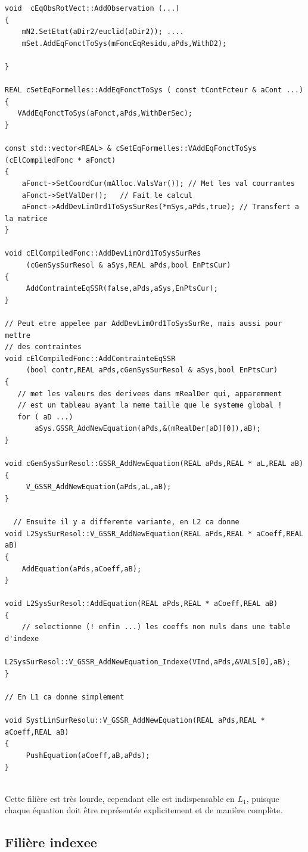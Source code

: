 {\small
\begin{verbatim}
void  cEqObsRotVect::AddObservation (...)
{
    mN2.SetEtat(aDir2/euclid(aDir2)); ....
    mSet.AddEqFonctToSys(mFoncEqResidu,aPds,WithD2);

}

REAL cSetEqFormelles::AddEqFonctToSys ( const tContFcteur & aCont ...)
{
   VAddEqFonctToSys(aFonct,aPds,WithDerSec);
}

const std::vector<REAL> & cSetEqFormelles::VAddEqFonctToSys (cElCompiledFonc * aFonct)
{
    aFonct->SetCoordCur(mAlloc.ValsVar()); // Met les val courrantes
    aFonct->SetValDer();   // Fait le calcul
    aFonct->AddDevLimOrd1ToSysSurRes(*mSys,aPds,true); // Transfert a la matrice
}

void cElCompiledFonc::AddDevLimOrd1ToSysSurRes
     (cGenSysSurResol & aSys,REAL aPds,bool EnPtsCur)
{
     AddContrainteEqSSR(false,aPds,aSys,EnPtsCur);
}

// Peut etre appelee par AddDevLimOrd1ToSysSurRe, mais aussi pour mettre
// des contraintes
void cElCompiledFonc::AddContrainteEqSSR
     (bool contr,REAL aPds,cGenSysSurResol & aSys,bool EnPtsCur)
{
   // met les valeurs des derivees dans mRealDer qui, apparemment
   // est un tableau ayant la meme taille que le systeme global !
   for ( aD ...)
       aSys.GSSR_AddNewEquation(aPds,&(mRealDer[aD][0]),aB);
}

void cGenSysSurResol::GSSR_AddNewEquation(REAL aPds,REAL * aL,REAL aB)
{
     V_GSSR_AddNewEquation(aPds,aL,aB);
}

  // Ensuite il y a differente variante, en L2 ca donne
void L2SysSurResol::V_GSSR_AddNewEquation(REAL aPds,REAL * aCoeff,REAL aB)
{
    AddEquation(aPds,aCoeff,aB);
}

void L2SysSurResol::AddEquation(REAL aPds,REAL * aCoeff,REAL aB)
{
    // selectionne (! enfin ...) les coeffs non nuls dans une table d'indexe
    L2SysSurResol::V_GSSR_AddNewEquation_Indexe(VInd,aPds,&VALS[0],aB);
}

// En L1 ca donne simplement

void SystLinSurResolu::V_GSSR_AddNewEquation(REAL aPds,REAL * aCoeff,REAL aB)
{
     PushEquation(aCoeff,aB,aPds);
}


\end{verbatim}
}


Cette fili\`ere est tr\`es lourde, cependant elle est indispensable en $L_1$, puisque
chaque \'equation doit \^etre repr\'esent\'ee explicitement et de mani\`ere compl\`ete.


\subsection {Fili\`ere indexee}

